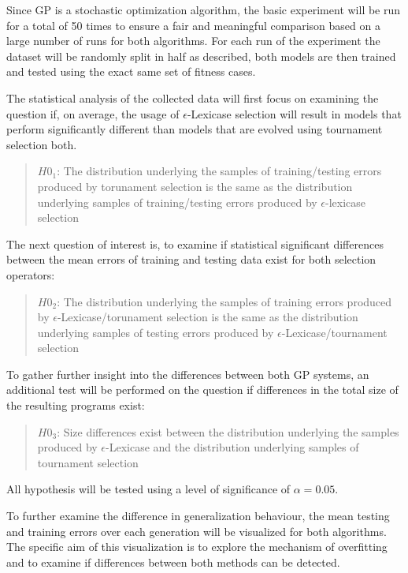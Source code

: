 \documentclass[
  12pt,
]{article}
\begin{document}
Since GP is a stochastic optimization algorithm, the basic experiment
will be run for a total of 50 times to ensure a fair and meaningful
comparison based on a large number of runs for both algorithms. For each
run of the experiment the dataset will be randomly split in half as
described, both models are then trained and tested using the exact same
set of fitness cases.

The statistical analysis of the collected data will first focus on
examining the question if, on average, the usage of
\(\epsilon\)-Lexicase selection will result in models that perform
significantly different than models that are evolved using tournament
selection both.

\begin{quote}
\(H0_{1}\): The distribution underlying the samples of training/testing
errors produced by torunament selection is the same as the distribution
underlying samples of training/testing errors produced by
\(\epsilon\)-lexicase selection
\end{quote}

The next question of interest is, to examine if statistical significant
differences between the mean errors of training and testing data exist
for both selection operators:

\begin{quote}
\(H0_{2}\): The distribution underlying the samples of training errors
produced by \(\epsilon\)-Lexicase/torunament selection is the same as
the distribution underlying samples of testing errors produced by
\(\epsilon\)-Lexicase/tournament selection
\end{quote}

To gather further insight into the differences between both GP systems,
an additional test will be performed on the question if differences in
the total size of the resulting programs exist:

\begin{quote}
\(H0_{3}\): Size differences exist between the distribution underlying
the samples produced by \(\epsilon\)-Lexicase and the distribution
underlying samples of tournament selection
\end{quote}

All hypothesis will be tested using a level of significance of
\(\alpha=0.05\).

To further examine the difference in generalization behaviour, the mean
testing and training errors over each generation will be visualized for
both algorithms. The specific aim of this visualization is to explore
the mechanism of overfitting and to examine if differences between both
methods can be detected.
\end{document}
